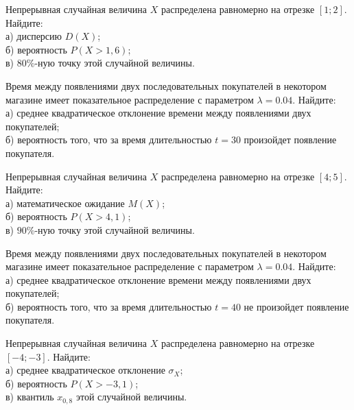 \vfill

\newpage\setcounter{zad}{0}

\z Непрерывная случайная величина $X$ распределена равномерно на отрезке $[1; 2]$. Найдите: \\ \quad а) дисперсию $D(X)$; \\ \quad б) вероятность $P(X>1{,}6)$; \\ \quad в) $80\%$-ную точку этой случайной величины.


\vfill

\z Время между появлениями двух последовательных покупателей в некотором магазине имеет показательное распределение с параметром $\lambda = 0.04$. Найдите: \\ \quad а) среднее квадратическое отклонение времени между появлениями двух покупателей; \\ \quad б) вероятность того, что за время длительностью $t = 30$  произойдет появление покупателя.
 

\vfill

\newpage\setcounter{zad}{0}

\z Непрерывная случайная величина $X$ распределена равномерно на отрезке $[4; 5]$. Найдите: \\ \quad а) математическое ожидание $M(X)$; \\ \quad б) вероятность $P(X>4{,}1)$; \\ \quad в) $90\%$-ную точку этой случайной величины.


\vfill

\z Время между появлениями двух последовательных покупателей в некотором магазине имеет показательное распределение с параметром $\lambda = 0.04$. Найдите: \\ \quad а) среднее квадратическое отклонение времени между появлениями двух покупателей; \\ \quad б) вероятность того, что за время длительностью $t = 40$ не произойдет появление покупателя.
 

\vfill

\newpage\setcounter{zad}{0}

\z Непрерывная случайная величина $X$ распределена равномерно на отрезке $[-4; -3]$. Найдите: \\ \quad а) среднее квадратическое отклонение $\sigma_X$; \\ \quad б) вероятность $P(X>-3{,}1)$; \\ \quad в) квантиль $x_{0{,}8}$ этой случайной величины.


\vfill

